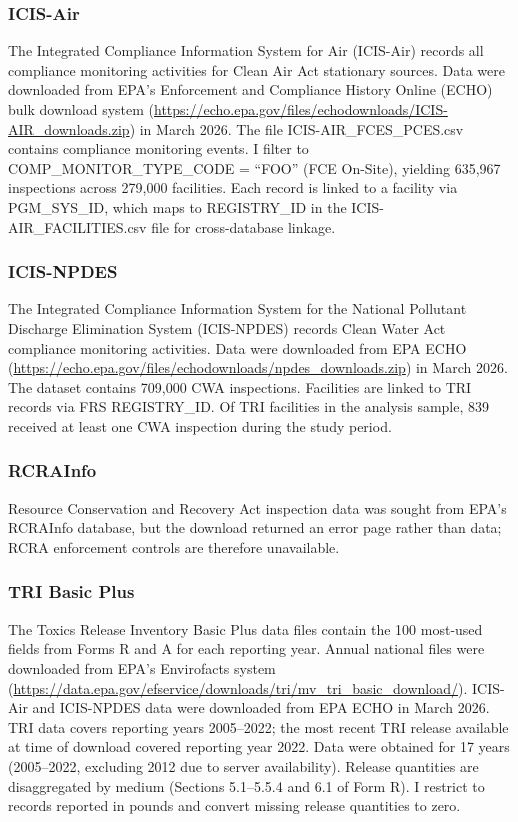 \documentclass[12pt]{article}
\begin{document}
\subsubsection*{ICIS-Air} The Integrated Compliance Information System for Air (ICIS-Air) records all compliance monitoring activities for Clean Air Act stationary sources. Data were downloaded from EPA's Enforcement and Compliance History Online (ECHO) bulk download system (\url{https://echo.epa.gov/files/echodownloads/ICIS-AIR_downloads.zip}) in March 2026. The file ICIS-AIR\_FCES\_PCES.csv contains compliance monitoring events. I filter to COMP\_MONITOR\_TYPE\_CODE = ``FOO'' (FCE On-Site), yielding 635,967 inspections across 279,000 facilities. Each record is linked to a facility via PGM\_SYS\_ID, which maps to REGISTRY\_ID in the ICIS-AIR\_FACILITIES.csv file for cross-database linkage.

\subsubsection*{ICIS-NPDES} The Integrated Compliance Information System for the National Pollutant Discharge Elimination System (ICIS-NPDES) records Clean Water Act compliance monitoring activities. Data were downloaded from EPA ECHO (\url{https://echo.epa.gov/files/echodownloads/npdes_downloads.zip}) in March 2026. The dataset contains 709,000 CWA inspections. Facilities are linked to TRI records via FRS REGISTRY\_ID. Of TRI facilities in the analysis sample, 839 received at least one CWA inspection during the study period.

\subsubsection*{RCRAInfo} Resource Conservation and Recovery Act inspection data was sought from EPA's RCRAInfo database, but the download returned an error page rather than data; RCRA enforcement controls are therefore unavailable.

\subsubsection*{TRI Basic Plus} The Toxics Release Inventory Basic Plus data files contain the 100 most-used fields from Forms R and A for each reporting year. Annual national files were downloaded from EPA's Envirofacts system (\url{https://data.epa.gov/efservice/downloads/tri/mv_tri_basic_download/}). ICIS-Air and ICIS-NPDES data were downloaded from EPA ECHO in March 2026. TRI data covers reporting years 2005--2022; the most recent TRI release available at time of download covered reporting year 2022. Data were obtained for 17 years (2005--2022, excluding 2012 due to server availability). Release quantities are disaggregated by medium (Sections 5.1--5.5.4 and 6.1 of Form R). I restrict to records reported in pounds and convert missing release quantities to zero.
\end{document}

